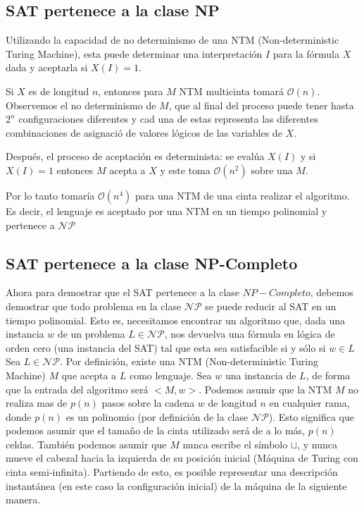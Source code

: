 \documentclass[a4paper]{article}
\begin{document}
\subsection{SAT pertenece a la clase NP}


Utilizando la capacidad de no determinismo de una NTM (Non-deterministic Turing Machine), esta puede determinar una interpretación $I$ para la fórmula $X$ dada y aceptarla si $X(I)=1$.


Si $X$ es de longitud $n$, entonces para $M$ NTM multicinta tomará $\mathcal{O}(n)$. Observemos el no determinismo de $M$, que al final del proceso puede tener hasta $2^{n}$ configuraciones diferentes y cad una de estas representa las diferentes combinaciones de asignació de valores lógicos de las variables de $X$.


Después, el proceso de aceptación es determinista: se evalúa $X(I)$ y si $X(I)=1$ entonces $M$ acepta a $X$ y este toma  $\mathcal{O}(n^{2})$ sobre una $M$.


Por lo tanto tomaría $\mathcal{O}(n^{4})$ para una NTM de una cinta realizar el algoritmo. Es decir, el lenguaje es aceptado por una NTM en un tiempo polinomial y pertenece a $\mathcal{NP}$


\subsection{SAT pertenece a la clase NP-Completo}
Ahora para demostrar que el SAT pertenece a la clase $NP-Completo$, debemos demostrar que todo problema en la clase $\mathcal{NP}$ se puede reducir al SAT en un tiempo polinomial. Esto es, necesitamos encontrar un algoritmo que, dada una instancia $w$ de un problema $L \in \mathcal{NP}$, nos devuelva una fórmula en lógica de orden cero (una instancia del SAT) tal que esta sea satisfacible si y sólo si $w\in L$\\


Sea $L \in \mathcal{NP}$. Por definición, existe una NTM (Non-deterministic Turing Machine) $M$ que acepta a $L$ como lenguaje. Sea $w$ una instancia de $L$, de forma que la entrada del algoritmo será $<M,w>$. Podemos asumir que la NTM $M$ no realiza mas de $p(n)$ pasos sobre la cadena $w$ de longitud $n$ en cualquier rama, donde $p(n)$ es un polinomio (por definición de la clase $\mathcal{NP}$). Esto significa que podemos asumir que el tamaño de la cinta utilizado será de a lo más, $p(n)$ celdas. También podemos asumir que $M$ nunca escribe el símbolo $\sqcup$, y nunca mueve el cabezal hacia la izquierda de su posición inicial (Máquina de Turing con cinta semi-infinita).
Partiendo de esto, es posible representar una descripción instantánea (en este caso la configuración inicial) de la máquina de la siguiente manera.
\end{document}
